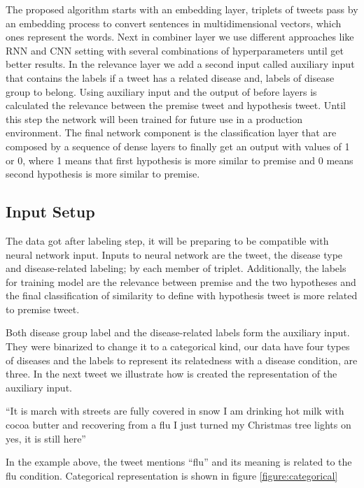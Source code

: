 \documentclass[12pt]{report}
\begin{document}
The proposed algorithm starts with an embedding layer, triplets of tweets pass by an embedding process to convert sentences in multidimensional vectors, which ones represent the words. Next in combiner layer we use different approaches like \ac{RNN} and \ac{CNN} setting with several combinations of hyperparameters until get better results.
In the relevance layer we add a second input called auxiliary input that contains the labels if a tweet has a related disease and, labels of disease group to belong. Using auxiliary input and the output of before layers is calculated the relevance between the premise tweet and hypothesis tweet. Until this step the network will been trained for future use in a production environment.
The final network component is the classification layer that are composed by a sequence of dense layers to finally get an output with values of 1 or 0, where 1 means that first hypothesis is more similar to premise and 0 means second hypothesis is more similar to premise.


\subsection{Input Setup}
The data got after labeling step, it will be preparing to be compatible with neural network input. Inputs to neural network are the tweet, the disease type and disease-related labeling; by each member of triplet. Additionally, the labels for training model are the relevance between premise and the two hypotheses and the final classification of similarity to define with hypothesis tweet is more related to premise tweet.

Both disease group label and the disease-related labels form the auxiliary input. They were binarized to change it to a categorical kind, our data have four types of diseases and the labels to represent its relatedness with a disease condition, are three. In the next tweet we illustrate how is created the representation of the auxiliary input.

\begin{definition}
``It is march with streets are fully covered in snow I am drinking hot milk with cocoa butter and recovering from a flu I just turned my Christmas tree lights on yes, it is still here''
\end{definition}

In the example above, the tweet mentions ``flu'' and its meaning is related to the flu condition. Categorical representation is shown in figure \ref{figure:categorical}
\end{document}
